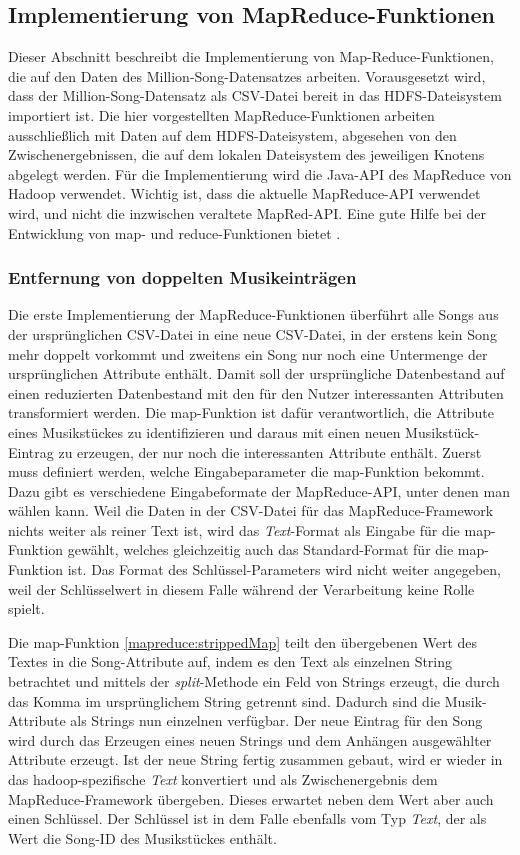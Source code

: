 \subsection{Implementierung von MapReduce-Funktionen}

Dieser Abschnitt beschreibt die Implementierung von Map-Reduce-Funktionen, die auf den Daten
des Million-Song-Datensatzes arbeiten. Vorausgesetzt wird, dass der Million-Song-Datensatz als
CSV-Datei bereit in das HDFS-Dateisystem importiert ist. Die hier vorgestellten MapReduce-Funktionen
arbeiten ausschließlich mit Daten auf dem HDFS-Dateisystem, abgesehen von den Zwischenergebnissen,
die auf dem lokalen Dateisystem des jeweiligen Knotens abgelegt werden.
Für die Implementierung wird die Java-API des MapReduce von Hadoop verwendet. Wichtig ist,
dass die aktuelle MapReduce-API verwendet wird, und nicht die inzwischen veraltete MapRed-API.
Eine gute Hilfe bei der Entwicklung von map- und reduce-Funktionen bietet \cite{miner2012mapreduce}.

\subsubsection{Entfernung von doppelten Musikeinträgen}

Die erste Implementierung der MapReduce-Funktionen überführt alle Songs aus der ursprünglichen
CSV-Datei in eine neue CSV-Datei, in der erstens kein Song mehr doppelt vorkommt und zweitens
ein Song nur noch eine Untermenge der ursprünglichen Attribute enthält. Damit soll der ursprüngliche
Datenbestand auf einen reduzierten Datenbestand mit den für den Nutzer interessanten Attributen 
transformiert werden. Die map-Funktion ist dafür verantwortlich, die Attribute eines Musikstückes
zu identifizieren und daraus mit einen neuen Musikstück-Eintrag zu erzeugen, der nur noch die interessanten
Attribute enthält.
Zuerst muss definiert werden, welche Eingabeparameter die map-Funktion bekommt. Dazu gibt es verschiedene
Eingabeformate der MapReduce-API, unter denen man wählen kann. Weil die Daten in der CSV-Datei für das
MapReduce-Framework nichts weiter als reiner Text ist, wird das \textit{Text}-Format als Eingabe für
die map-Funktion gewählt, welches gleichzeitig auch das Standard-Format für die map-Funktion ist.
Das Format des Schlüssel-Parameters wird nicht weiter angegeben, weil der Schlüsselwert in diesem Falle 
während der Verarbeitung keine Rolle spielt.

Die map-Funktion \ref{mapreduce:strippedMap} teilt den übergebenen Wert des Textes in die Song-Attribute auf, indem es den Text
als einzelnen String betrachtet und mittels der \textit{split}-Methode ein Feld von Strings erzeugt, die durch
das Komma im ursprünglichem String getrennt sind. Dadurch sind die Musik-Attribute als Strings nun einzelnen verfügbar.
Der neue Eintrag für den Song wird durch das Erzeugen eines neuen Strings und dem Anhängen ausgewählter
Attribute erzeugt. Ist der neue String fertig zusammen gebaut, wird er wieder in das hadoop-spezifische \textit{Text}
konvertiert und als Zwischenergebnis dem MapReduce-Framework übergeben. Dieses erwartet neben dem 
Wert aber auch einen Schlüssel. Der Schlüssel ist in dem Falle ebenfalls vom Typ \textit{Text}, der als Wert die
Song-ID des Musikstückes enthält.

